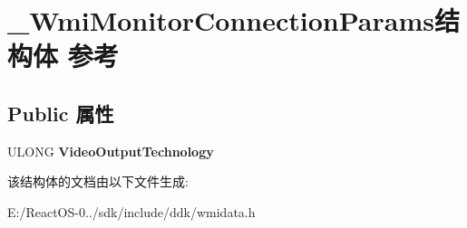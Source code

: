 \hypertarget{struct___wmi_monitor_connection_params}{}\section{\+\_\+\+Wmi\+Monitor\+Connection\+Params结构体 参考}
\label{struct___wmi_monitor_connection_params}
\subsection*{Public 属性}
\begin{DoxyCompactItemize}
\item 
\mbox{\label{struct___wmi_monitor_connection_params_a8f4657cdbb02561260bfc2782605dd24}} 
U\+L\+O\+NG {\bfseries Video\+Output\+Technology}
\end{DoxyCompactItemize}


该结构体的文档由以下文件生成\+:\begin{DoxyCompactItemize}
\item 
E\+:/\+React\+O\+S-\/0../sdk/include/ddk/wmidata.\+h\end{DoxyCompactItemize}

